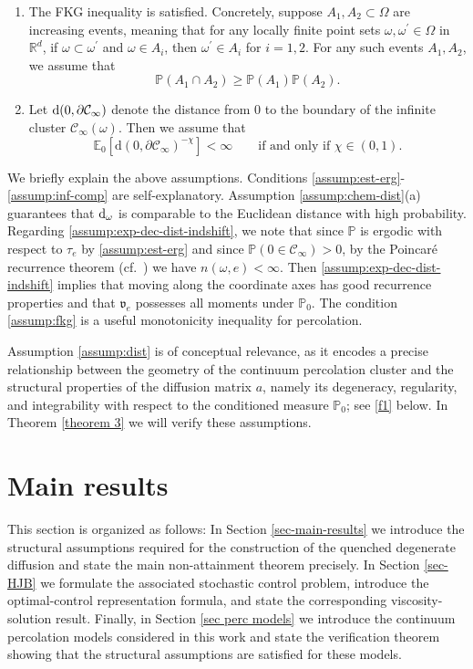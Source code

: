 \documentclass[11pt]{article}
\renewcommand{\d}{{\rm d}}
\newcommand{\R}{\mathbb R}
\newcommand{\E}{\mathbb E}
\renewcommand{\P}{\mathbb P}
\theoremstyle{rem}
\begin{document}
\begin{enumerate}[label=\textbf{(P\arabic*)}]
\item The FKG inequality is satisfied. Concretely, suppose $A_1,A_2\subset
\Omega$ are increasing events, meaning that for any locally finite point sets
$\omega, \omega^\prime \in \Omega$ in $\R^d$, if
$\omega \subset \omega^\prime$ and $\omega \in A_i$, then
$\omega^\prime \in A_i$ for $i=1,2$. For any such events $A_1,A_2$, we assume
that
\[
{\P}(A_1\cap A_2)\geq {\P}(A_1){\P}(A_2).
\]
\label{assump:fkg}

\item Let $\d(0,\partial\mathcal C_\infty)$ denote the distance from $0$ to the
boundary of the infinite cluster $\mathcal C_\infty(\omega)$. Then we assume
that
\[
\E_0[\mathrm d(0,\partial\mathcal C_\infty)^{-\chi}]<\infty
\qquad\mbox{if and only if $\chi\in(0,1)$}.
\]
\label{assump:dist}

\end{enumerate}

We briefly explain the above assumptions. Conditions
\ref{assump:est-erg}-\ref{assump:inf-comp} are self-explanatory.
Assumption \ref{assump:chem-dist}(a) guarantees that $\d_\omega$ is comparable
to the Euclidean distance with high probability. Regarding
\ref{assump:exp-dec-dist-indshift}, we note that since $\P$ is ergodic with
respect to $\tau_e$ by \ref{assump:est-erg} and since
${\P}(0\in{\mathcal C_\infty})>0$, by the Poincar\'e recurrence theorem
(cf.\ \cite[Sec.\ 2.3]{P89}) we have $n(\omega,e)<\infty$.
Then \ref{assump:exp-dec-dist-indshift} implies that moving along the
coordinate axes has good recurrence properties and that $\mathfrak v_e$
possesses all moments under $\P_0$. The condition \ref{assump:fkg} is a useful
monotonicity inequality for percolation.

Assumption \ref{assump:dist} is of conceptual relevance, as it encodes a
precise relationship between the geometry of the continuum percolation cluster
and the structural properties of the diffusion matrix $a$, namely its
degeneracy, regularity, and integrability with respect to the conditioned
measure $\P_0$; see \ref{f1} below. In Theorem \ref{theorem 3} we will verify these assumptions. 




\section{Main results}\label{sec-results}
This section is organized as follows: In Section  \ref{sec-main-results} we
introduce the structural assumptions required for the construction of the
quenched degenerate diffusion and state the main non-attainment theorem
precisely. In Section \ref{sec-HJB} we formulate the associated stochastic control
problem, introduce the optimal-control representation formula, and state the
corresponding viscosity-solution result. Finally, in Section \ref{sec perc models} we introduce
the continuum percolation models considered in this work and state the
verification theorem showing that the structural assumptions are satisfied for
these models.
\end{document}
